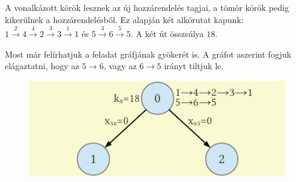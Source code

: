 \documentclass[a4paper,12pt,svgnames]{report}
\begin{document}
\begin{multicols}{2}
\begin{megoldas}
\begin{center}
\end{center}

A vonalkázott körök lesznek az új hozzárendelés tagjai, a tömör körök pedig kikerülnek a hozzárendelésből. Ez alapján két alkörutat kapunk: $1\xrightarrow{2}4\xrightarrow{4}2\xrightarrow{3}3\xrightarrow{1}1$ és $5\xrightarrow{3}6\xrightarrow{5}5$. A két út összsúlya $18$.

Most már felírhatjuk a feladat gráfjának gyökerét is. A gráfot aszerint fogjuk elágaztatni, hogy az $5\rightarrow 6$, vagy az $6\rightarrow 5$ irányt tiltjuk le.
\end{megoldas}

\begin{megoldas}
\begin{figure}[H]
\centering
\includegraphics{kepek/alkorut.pdf}
\end{figure}


\end{megoldas}
\end{multicols}
\end{document}
